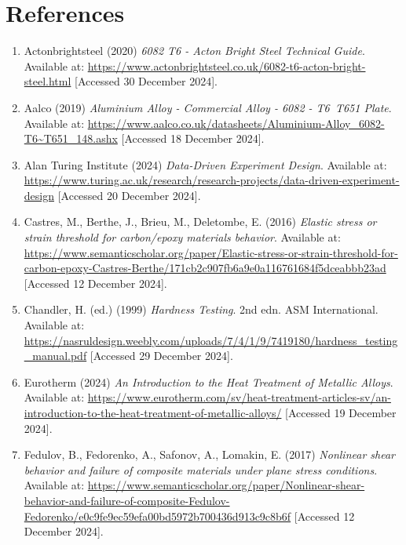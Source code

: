 \documentclass{article}
\begin{document}
{    
    
    \newpage\vspace*{-30pt}

\section{References}
\begin{enumerate}
    \item Actonbrightsteel (2020) \textit{6082 T6 - Acton Bright Steel Technical Guide}. Available at: \url{https://www.actonbrightsteel.co.uk/6082-t6-acton-bright-steel.html} [Accessed 30 December 2024].
    
    \item Aalco (2019) \textit{Aluminium Alloy - Commercial Alloy - 6082 - T6~T651 Plate}. Available at: \url{https://www.aalco.co.uk/datasheets/Aluminium-Alloy_6082-T6~T651_148.ashx} [Accessed 18 December 2024].
    
    \item Alan Turing Institute (2024) \textit{Data-Driven Experiment Design}. Available at: \url{https://www.turing.ac.uk/research/research-projects/data-driven-experiment-design} [Accessed 20 December 2024].
    
    \item Castres, M., Berthe, J., Brieu, M., Deletombe, E. (2016) \textit{Elastic stress or strain threshold for carbon/epoxy materials behavior}. Available at: \url{https://www.semanticscholar.org/paper/Elastic-stress-or-strain-threshold-for-carbon-epoxy-Castres-Berthe/171cb2c907fb6a9e0a116761684f5dceabbb23ad} [Accessed 12 December 2024].
    
    \item Chandler, H. (ed.) (1999) \textit{Hardness Testing}. 2nd edn. ASM International. Available at: \url{https://nasruldesign.weebly.com/uploads/7/4/1/9/7419180/hardness_testing_manual.pdf} [Accessed 29 December 2024].
    
    \item Eurotherm (2024) \textit{An Introduction to the Heat Treatment of Metallic Alloys}. Available at: \url{https://www.eurotherm.com/sv/heat-treatment-articles-sv/an-introduction-to-the-heat-treatment-of-metallic-alloys/} [Accessed 19 December 2024].
    
    \item Fedulov, B., Fedorenko, A., Safonov, A., Lomakin, E. (2017) \textit{Nonlinear shear behavior and failure of composite materials under plane stress conditions}. Available at: \url{https://www.semanticscholar.org/paper/Nonlinear-shear-behavior-and-failure-of-composite-Fedulov-Fedorenko/e0c9fe9ec59efa00bd5972b700436d913c9c8b6f} [Accessed 12 December 2024].
    

\end{enumerate}}
\end{document}
